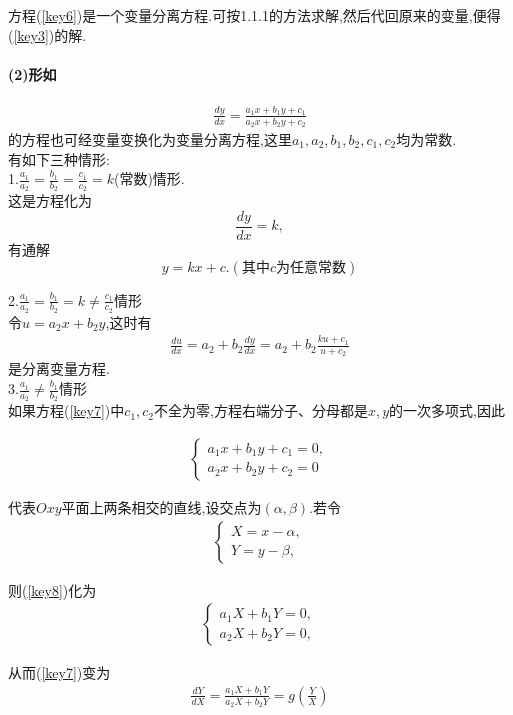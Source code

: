 \documentclass[UTF8]{article}
\begin{document}
方程(\ref{key6})是一个变量分离方程.可按1.1.1的方法求解,然后代回原来的变量,便得(\ref{key3})的解.
\paragraph{(2)形如}
\begin{align}\label{key7}
\frac{dy}{dx}=\frac{a_1 x+b_1 y+c_1}{a_2 x+b_2 y+c_2}
\end{align}
的方程也可经变量变换化为变量分离方程,这里$a_1,a_2,b_1,b_2,c_1,c_2$均为常数.
\\有如下三种情形:
\\
1.$\frac{a_1}{a_2}=\frac{b_1}{b_2}=\frac{c_1}{c_2}=k$(常数)情形.
\\
这是方程化为
$$
\frac{dy}{dx}=k,
$$
有通解
$$
y=kx+c.(\text{其中$c$为任意常数})
$$

2.$\frac{a_1}{a_2}=\frac{b_1}{b_2}=k \ne \frac{c_1}{c_2}$情形\\
令$u=a_2x+b_2y$,这时有
\begin{align*}
\frac{du}{dx}=a_2+b_2\frac{dy}{dx}=a_2+b_2\frac{ku+c_1}{u+c_2}
\end{align*}
是分离变量方程.\\
3.$\frac{a_1}{a_2} \ne \frac{b_1}{b_2}$情形\\
如果方程(\ref{key7})中$c_1,c_2$不全为零,方程右端分子、分母都是$x,y$的一次多项式,因此

\begin{align}\label{key8}
\begin{cases}
a_1x+b_1y+c_1=0,\\
a_2x+b_2y+c_2=0
\end{cases}
\end{align}

代表$Oxy$平面上两条相交的直线,设交点为$(\alpha,\beta)$.若令
\begin{align}\label{key9}
\begin{cases}
X=x-\alpha,\\
Y=y-\beta,
\end{cases}
\end{align}

则(\ref{key8})化为
\begin{align*}
\begin{cases}
a_1X+b_1Y=0,\\
a_2X+b_2Y=0,
\end{cases}
\end{align*}

从而(\ref{key7})变为
\begin{align}\label{key10}
\frac{dY}{dX}=\frac{a_1X+b_1Y}{a_2X+b_2Y}=g(\frac{Y}{X})
\end{align}
\end{document}
